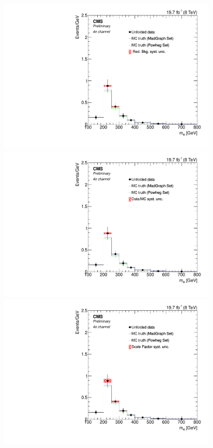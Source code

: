 \begin{figure}[hbtp]
\begin{center}
    \includegraphics[width=0.8\cmsFigWidth]{Figures/Unfolding/Systematics/ZZTo4e_Mass_RedBkg_Pow_fr}     
    \includegraphics[width=0.8\cmsFigWidth]{Figures/Unfolding/Systematics/ZZTo4e_Mass_UnfDataOverGenMC_Pow_fr}
    \includegraphics[width=0.8\cmsFigWidth]{Figures/Unfolding/Systematics/ZZTo4e_Mass_SFSq_Pow_fr}          

\end{center}
\end{figure}

